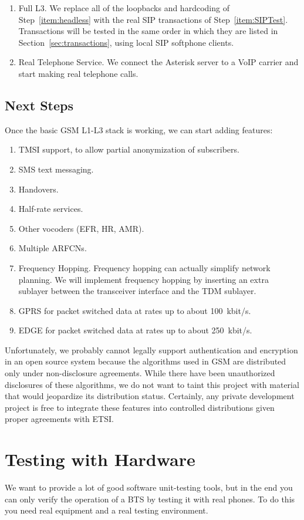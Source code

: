 \documentclass[11pt]{book}
\begin{document}
\begin{enumerate}
	\item Full L3.  We replace all of the loopbacks and hardcoding of Step~\ref{item:headless} with the real SIP transactions of Step~\ref{item:SIPTest}.  Transactions will be tested in the same order in which they are listed in Section~\ref{sec:transactions}, using local SIP softphone clients.
	\item Real Telephone Service.  We connect the Asterisk server to a VoIP carrier and start making real telephone calls.
\end{enumerate}

\section{Next Steps}
Once the basic GSM L1-L3 stack is working, we can start adding features:

\begin{enumerate}
	\item TMSI support, to allow partial anonymization of subscribers.
	\item SMS text messaging.
	\item Handovers.
	\item Half-rate services.
	\item Other vocoders (EFR, HR, AMR).
	\item Multiple ARFCNs.
	\item Frequency Hopping.  Frequency hopping can actually simplify network planning.  We will implement frequency hopping by inserting an extra sublayer between the transceiver interface and the TDM sublayer.
	\item GPRS for packet switched data at rates up to about 100~kbit/s.
	\item EDGE for packet switched data at rates up to about 250~kbit/s.
\end{enumerate}

Unfortunately, we probably cannot legally support authentication and encryption in an open source system because the algorithms used in GSM are distributed only under non-disclosure agreements.  While there have been unauthorized disclosures of these algorithms, we do not want to taint this project with material that would jeopardize its distribution status.  Certainly, any private development project is free to integrate these features into controlled distributions given proper agreements with ETSI.



\chapter{Testing with Hardware}
We want to provide a lot of good software unit-testing tools, but in the end you can only verify the operation of a BTS by testing it with real phones.  To do this you need real equipment and a real testing environment.
\end{document}
